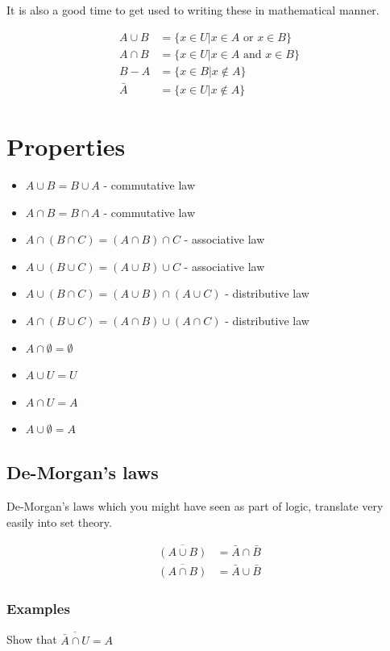 \documentclass[12pt]{article}
\begin{document}
It is also a good time to get used to writing these in mathematical manner.

\begin{align*}
A \cup B &= \{x \in U | x \in A \text{ or } x \in B\} \\
A \cap B &= \{x \in U | x \in A \text{ and } x \in B \} \\
B - A &= \{x \in B | x \not \in A\} \\
\bar{A} &= \{x \in U | x \not \in A\}
\end{align*}


\section*{Properties}
\begin{itemize}
\item $A \cup B = B \cup A $ - commutative law
\item $A \cap B = B \cap A$ - commutative law
\item $A \cap (B \cap C) = (A \cap B) \cap C$ - associative law
\item $A \cup (B \cup C) = (A \cup B) \cup C$ - associative law
\item $A \cup (B \cap C) = (A \cup B) \cap (A \cup C)$ - distributive law
\item $A \cap (B \cup C) = (A \cap B) \cup (A \cap C)$ - distributive law
\item $A \cap \emptyset = \emptyset$
\item $A \cup U = U$
\item $A \cap U = A$
\item $A \cup \emptyset = A$

\end{itemize}

\subsection*{De-Morgan's laws}
De-Morgan's laws which you might have seen as part of logic, translate very easily into set theory.

\begin{align*}
\overline{(A \cup B)} &= \bar{A} \cap \bar{B} \\
\overline{(A \cap B)} &= \bar{A} \cup \bar{B}
\end{align*}

\subsubsection*{Examples}
Show that $\overline{\bar{A} \cap U} = A$
\end{document}
